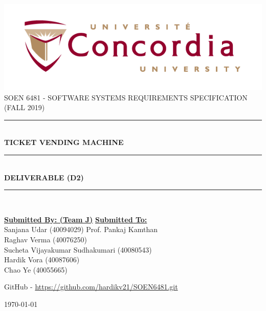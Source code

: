 \documentclass[12pt]{report}
\begin{document}
\begin{titlepage}
	\newcommand{\HRule}{\rule{\linewidth}{0.5mm}} %
	
	
	\centering 
	\includegraphics[scale=.5]{logo.png}\\[1cm] 
	\textsc{\Large SOEN 6481 - SOFTWARE SYSTEMS REQUIREMENTS SPECIFICATION (FALL 2019)} \\  [0.5cm]
	
	
	\HRule \\[0.4cm]
	{ \huge \bfseries TICKET VENDING MACHINE}\\[0.4cm] 
	\HRule \\[0.5cm]
	
	{\large \textbf{DELIVERABLE (D2)} }	
	
	\HRule \\[1.5cm]
	\vspace{1cm}
	
	\begin{flushleft}
		
		
		\textbf{\underline{\Large Submitted By: (Team J)}}
		\hfill
		\textbf{\underline{\Large Submitted To:}} \\
		\vspace{3mm}
		\large Sanjana Udar (40094029)
		\hfill
		\large Prof. Pankaj Kamthan \\
		
		\large Raghav Verma (40076250) \hfill \\
		\large Sucheta Vijayakumar Sudhakumari (40080543) \hfill \\
		\large Hardik Vora (40087606) \hfill \\
		\large Chao Ye (40055665) \\
		
	\end{flushleft}
	
	\centering \vspace{1cm}
	
	GitHub - \href{https://github.com/hardikv21/SOEN6481.git}{https://github.com/hardikv21/SOEN6481.git}
	
	\vspace{0.1cm}
	{\large \today}\\[2cm]
	
	\vfill
\end{titlepage}
\end{document}
